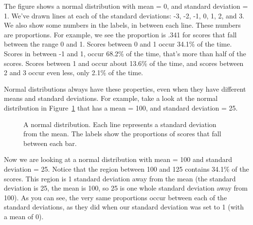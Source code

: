 \documentclass[
  letterpaper,
  DIV=11,
  numbers=noendperiod]{scrreprt}
\begin{document}
The figure shows a normal distribution with mean = 0, and standard
deviation = 1. We've drawn lines at each of the standard deviations: -3,
-2, -1, 0, 1, 2, and 3. We also show some numbers in the labels, in
between each line. These numbers are proportions. For example, we see
the proportion is .341 for scores that fall between the range 0 and 1.
Scores between 0 and 1 occur 34.1\% of the time. Scores in between -1
and 1, occur 68.2\% of the time, that's more than half of the scores.
Scores between 1 and occur about 13.6\% of the time, and scores between
2 and 3 occur even less, only 2.1\% of the time.

Normal distributions always have these properties, even when they have
different means and standard deviations. For example, take a look at the
normal distribution in Figure~\ref{fig-4normalSDspercentsB} that has a
mean = 100, and standard deviation = 25.

\begin{figure}


\caption{\label{fig-4normalSDspercentsB}A normal distribution. Each line
represents a standard deviation from the mean. The labels show the
proportions of scores that fall between each bar.}

\end{figure}%

Now we are looking at a normal distribution with mean = 100 and standard
deviation = 25. Notice that the region between 100 and 125 contains
34.1\% of the scores. This region is 1 standard deviation away from the
mean (the standard deviation is 25, the mean is 100, so 25 is one whole
standard deviation away from 100). As you can see, the very same
proportions occur between each of the standard deviations, as they did
when our standard deviation was set to 1 (with a mean of 0).
\end{document}
